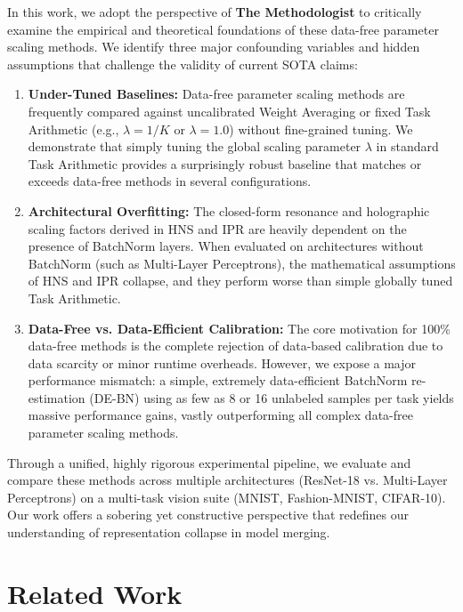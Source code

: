\documentclass{article}
\begin{document}
In this work, we adopt the perspective of \textbf{The Methodologist} to critically examine the empirical and theoretical foundations of these data-free parameter scaling methods. We identify three major confounding variables and hidden assumptions that challenge the validity of current SOTA claims:
\begin{enumerate}
    \item \textbf{Under-Tuned Baselines:} Data-free parameter scaling methods are frequently compared against uncalibrated Weight Averaging or fixed Task Arithmetic (e.g., $\lambda = 1/K$ or $\lambda = 1.0$) without fine-grained tuning. We demonstrate that simply tuning the global scaling parameter $\lambda$ in standard Task Arithmetic provides a surprisingly robust baseline that matches or exceeds data-free methods in several configurations.
    \item \textbf{Architectural Overfitting:} The closed-form resonance and holographic scaling factors derived in HNS and IPR are heavily dependent on the presence of BatchNorm layers. When evaluated on architectures without BatchNorm (such as Multi-Layer Perceptrons), the mathematical assumptions of HNS and IPR collapse, and they perform worse than simple globally tuned Task Arithmetic.
    \item \textbf{Data-Free vs. Data-Efficient Calibration:} The core motivation for 100\% data-free methods is the complete rejection of data-based calibration due to data scarcity or minor runtime overheads. However, we expose a major performance mismatch: a simple, extremely data-efficient BatchNorm re-estimation (DE-BN) using as few as 8 or 16 unlabeled samples per task yields massive performance gains, vastly outperforming all complex data-free parameter scaling methods.
\end{enumerate}

Through a unified, highly rigorous experimental pipeline, we evaluate and compare these methods across multiple architectures (ResNet-18 vs. Multi-Layer Perceptrons) on a multi-task vision suite (MNIST, Fashion-MNIST, CIFAR-10). Our work offers a sobering yet constructive perspective that redefines our understanding of representation collapse in model merging.

\section{Related Work}
\label{sec:related}
\end{document}
